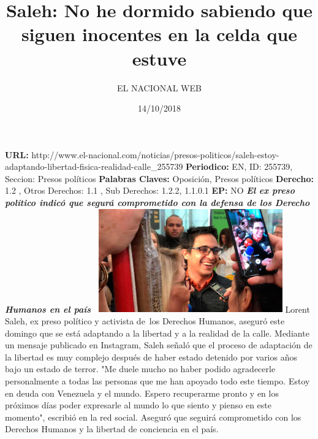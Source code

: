 \documentclass{article}%
\title{\textbf{Saleh: No he dormido sabiendo que siguen inocentes en la celda que estuve}}%
\author{EL NACIONAL WEB}%
\date{14/10/2018}%
\begin{document}
%
\normalsize%
\maketitle%
\textbf{URL: }%
http://www.el{-}nacional.com/noticias/presos{-}politicos/saleh{-}estoy{-}adaptando{-}libertad{-}fisica{-}realidad{-}calle\_255739\newline%
%
\textbf{Periodico: }%
EN, %
ID: %
255739, %
Seccion: %
Presos políticos\newline%
%
\textbf{Palabras Claves: }%
Oposición, Presos políticos\newline%
%
\textbf{Derecho: }%
1.2%
, Otros Derechos: %
1.1%
, Sub Derechos: %
1.2.2, 1.1.0.1%
\newline%
%
\textbf{EP: }%
NO\newline%
\newline%
%
\textbf{\textit{El ex preso político indicó que segurá comprometido con la defensa de los Derecho Humanos en el país~}}%
\newline%
\newline%
%
\includegraphics[width=300px]{221.jpg}%
\newline%
%
Lorent Saleh, ex preso político y activista de~los Derechos Humanos, aseguró este domingo que se está adaptando a la libertad y a la realidad de la calle.%
\newline%
%
Mediante un mensaje publicado en Instagram, Saleh señaló que el proceso de adaptación de la libertad es muy complejo después de haber estado detenido por varios años bajo un estado de terror.%
\newline%
%
"Me duele mucho no haber podido agradecerle personalmente a todas las personas que me han apoyado todo este tiempo. Estoy en deuda con Venezuela y el mundo. Espero recuperarme pronto y en los próximos días poder expresarle al mundo lo que siento y pienso en este momento", escribió en la red social.%
\newline%
%
Aseguró que seguirá comprometido con los Derechos Humanos y la libertad de conciencia en el país.%
\newline%
%
\end{document}
